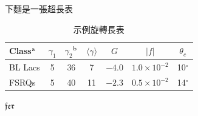 下麵是一張超長表
\begin{table}
	
	\caption{示例旋轉長表} 
	\centering
	\setlength{\tabcolsep}{10mm}
	\begin{tabular}[l]{@{}lcccccc}		
	\toprule		
	Class$^{\rm a}$ & $\gamma_1$ & $\gamma_2$$^{\rm b}$& $\langle \gamma \rangle$& $G$ & $|{ f}|$ & $\theta _{c}$ \\		
	\midrule	
	BL Lacs &5 & 36 & 7 & $-4.0$ & $1.0\times 10^{-2}$ & 10$^\circ$ \\		
	FSRQs & 5 & 40 & 11 & $-2.3$ & $0.5\times 10^{-2}$ & 14$^\circ$ \\		
	\bottomrule		
\end{tabular}
\end{table}


$\mathfrak{fer}$














